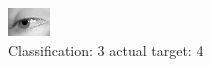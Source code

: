 \begin{figure}[h!]
\begin{center}
\includegraphics[width=0.60\columnwidth]{figures/ID3037_class_3_target_4.png}
\end{center}
\caption{ Classification: 3 actual target: 4}
\label{fig:ID3037_class_3_target_4}
\end{figure}
